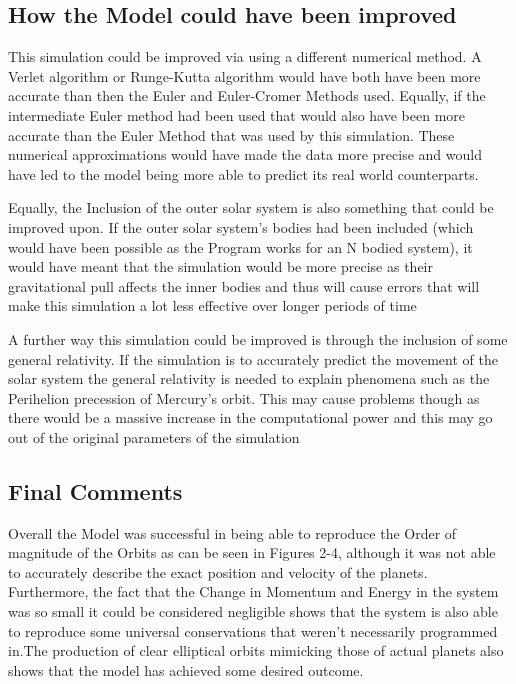 \documentclass[a4paper,10pt]{article}
\begin{document}
\subsection{How the Model could have been improved}
This simulation could be improved via using a different numerical method. A Verlet algorithm or Runge-Kutta algorithm would have both have been more accurate than then the Euler and Euler-Cromer Methods used. Equally, if the intermediate Euler method had been used that would also have been more accurate than the Euler Method that was used by this simulation. These numerical approximations would have made the data more precise and would have led to the model being more able to predict its real world counterparts.

Equally, the Inclusion of the outer solar system is also something that could be improved upon. If the outer solar system's bodies had been included (which would have been possible as the Program works for an N bodied system), it would have meant that the simulation would be more precise as their gravitational pull affects the inner bodies and thus will cause errors that will make this simulation a lot less effective over longer periods of time

A further way this simulation could be improved is through the inclusion of some general relativity. If the simulation is to accurately predict the movement of the solar system the general relativity is needed to explain phenomena such as the Perihelion precession of Mercury's orbit. This may cause problems though as there would be a massive increase in the computational power and this may go out of the original parameters of the simulation

\subsection{Final Comments}
Overall the Model was successful in being able to reproduce the Order of magnitude of the Orbits as can be seen in Figures 2-4, although it was not able to accurately describe the exact position and velocity of the planets. Furthermore, the fact that the Change in Momentum and Energy in the system was so small it could be considered negligible shows that the system is also able to reproduce some universal conservations that weren't necessarily programmed in.The production of clear elliptical orbits mimicking those of actual planets also shows that the model has achieved some desired outcome.
\end{document}
